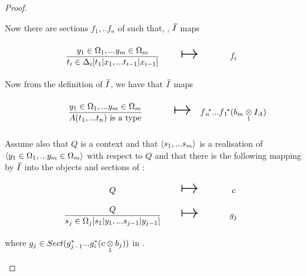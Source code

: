\begin{proof}
\begin{newtt}
Now there are sections  $f_1,..f_n$  of \catcw such that, \foreachi, $\Ibar$ maps
\begin{equation}
\label{timapping}
\begin{array}{c c c}
\forceSOURCEwidth & & \forceTARGETwidth \\ [-0.1cm]
\tirule    & \Imapsto & f_i \\ [0.4cm]
\end{array}
\end{equation} 
Now from the definition of $\Ibar$, we have that $\Ibar$ maps
\begin{equation*}
\begin{array}{c c c}
\forceSOURCEwidth & & \forceTARGETwidth \\ [-0.1cm]
\gatdisplayrule{\yOmega{m}}{\isT{A(\tn)}}   & \Imapsto & \fnvectorstar(\crossx{b_m}{I_A}{1})\\ [0.4cm]
\end{array}
\end{equation*} 

Assume also  that $Q$ is a context and that $\tuple{\sm}$ is a realisation of $\tuple{\yOmega{m}}$ with respect to $Q$
and that there is the following mapping by $\Ibar$ into the objects and sections of \catc:
\begin{equation}
\label{sjmapping}
\begin{array}{c c c}
\forceSOURCEwidth & & \forceTARGETwidth \\ [-0.1cm]
Q          & \Imapsto & c   \\ [0.4cm]
\IsOmega{j}    & \Imapsto & g_j \\ [0.4cm]
\end{array}
\end{equation}
where $g_j \in Sect(g_{j-1}^*...g_i^*(\crossx{c}{b_j}{1}))$ in \catc.


\end{newtt}
\end{proof}
